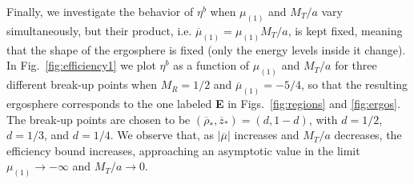 Finally, we investigate the behavior of $\eta ^{b}$ when $\mu_{(1)}$ and $M_T/a$ vary simultaneously, but their product, i.e. $\overline \mu_{(1)} = \mu_{(1)} M_T/a$, is kept fixed, meaning that the shape of the ergosphere is fixed (only the energy levels inside it change). In Fig.~\ref{fig:efficiency1} we plot $\eta^b$ as a function of $\mu_{(1)}$ and $M_T/a$ for three different break-up points when $M_R=1/2$ and $\overline \mu_{(1)} = -5/4$, so that the resulting ergosphere corresponds to the one labeled \textbf{E} in Figs.~\ref{fig:regions} and \ref{fig:ergos}. The break-up points are chosen to be $(\overline \rho_*,\overline z_*)=(d,1-d)$, with $d=1/2$, $d=1/3$, and $d=1/4$. We observe that, as $|\overline {\mu}|$ increases and $M_T/a$ decreases, the efficiency bound increases, approaching an asymptotic value in the limit $\mu_{(1)} \rightarrow -\infty$ and $M_T/a \rightarrow 0$.

